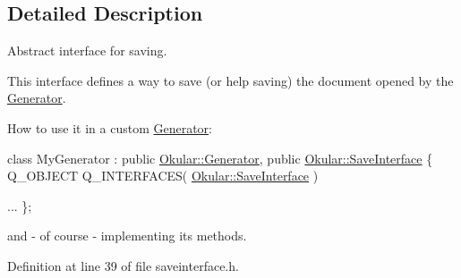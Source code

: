 \subsection{Detailed Description}
Abstract interface for saving. 

This interface defines a way to save (or help saving) the document opened by the \hyperlink{classOkular_1_1Generator}{Generator}.

How to use it in a custom \hyperlink{classOkular_1_1Generator}{Generator}\+: 
\begin{DoxyCode}
\textcolor{keyword}{class }MyGenerator : \textcolor{keyword}{public} \hyperlink{classOkular_1_1Generator}{Okular::Generator}, \textcolor{keyword}{public} 
      \hyperlink{classOkular_1_1SaveInterface}{Okular::SaveInterface}
\{
    Q\_OBJECT
    Q\_INTERFACES( \hyperlink{classOkular_1_1SaveInterface}{Okular::SaveInterface} )

    ...
\};
\end{DoxyCode}
 and -\/ of course -\/ implementing its methods. 

Definition at line 39 of file saveinterface.\+h.



